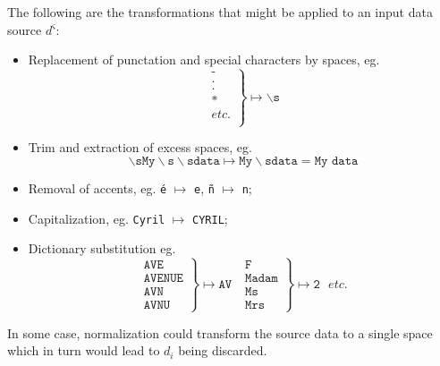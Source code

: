 \documentclass[twoside,twocolumn]{article}
\theoremstyle{definition}
\theoremstyle{remark}
\begin{document}
The following are the transformations that might be applied to an input data source $d^\varsigma$:
\begin{itemize}
    \item Replacement of punctation and special characters by spaces, eg.$$
        \left.
            \begin{array}{r}
                \texttt{-} \\
                \texttt{.} \\
                \texttt{.} \\
                \texttt{*} \\
                etc. \\
            \end{array}
        \right\} \mapsto \backslash\texttt{s}
    $$
    \item Trim and extraction of excess spaces, eg.$$
        \backslash\texttt{s} \texttt{My} \backslash\texttt{s} \backslash\texttt{s} \texttt{data} 
            \mapsto \texttt{My} \backslash\texttt{s} \texttt{data} = \texttt{My data}
    $$
    \item Removal of accents, eg. \texttt{é} $\mapsto$ \texttt{e}, \texttt{ñ} $\mapsto$ \texttt{n};
    \item Capitalization, eg. \texttt{Cyril} $\mapsto$  \texttt{CYRIL};
    \item Dictionary substitution eg. $$
        \left.
            \begin{array}{r}
                \texttt{AVE} \\
                \texttt{AVENUE} \\
                \texttt{AVN} \\
                \texttt{AVNU}
            \end{array}
        \right\} \mapsto \texttt{AV} ~~~ 
        \left.
            \begin{array}{r}
                \texttt{F} \\
                \texttt{Madam} \\
                \texttt{Ms} \\
                \texttt{Mrs}
            \end{array}
        \right\} \mapsto \texttt{2} ~~~ etc.
    $$
\end{itemize}

In some case, normalization could transform the source data to a single space which in turn would lead to $d_i$ being discarded.
\end{document}
